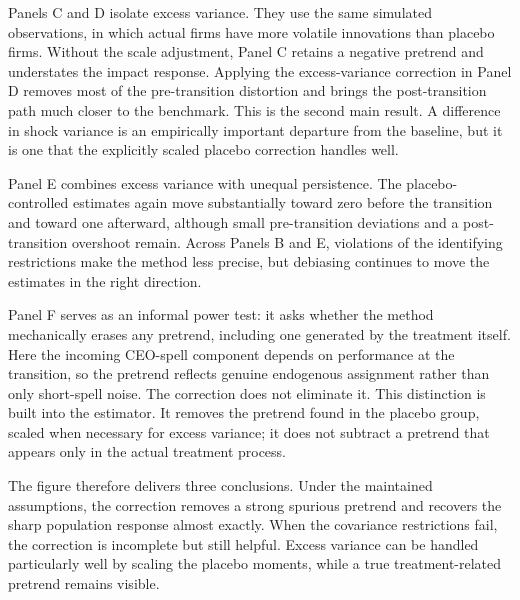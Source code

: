 \documentclass[sigconf,nonacm]{acmart}
\begin{document}
Panels C and D isolate excess variance. They use the same simulated observations, in which actual firms have more volatile innovations than placebo firms. Without the scale adjustment, Panel C retains a negative pretrend and understates the impact response. Applying the excess-variance correction in Panel D removes most of the pre-transition distortion and brings the post-transition path much closer to the benchmark. This is the second main result. A difference in shock variance is an empirically important departure from the baseline, but it is one that the explicitly scaled placebo correction handles well.

Panel E combines excess variance with unequal persistence. The placebo-controlled estimates again move substantially toward zero before the transition and toward one afterward, although small pre-transition deviations and a post-transition overshoot remain. Across Panels B and E, violations of the identifying restrictions make the method less precise, but debiasing continues to move the estimates in the right direction.

\balance

Panel F serves as an informal power test: it asks whether the method mechanically erases any pretrend, including one generated by the treatment itself. Here the incoming CEO-spell component depends on performance at the transition, so the pretrend reflects genuine endogenous assignment rather than only short-spell noise. The correction does not eliminate it. This distinction is built into the estimator. It removes the pretrend found in the placebo group, scaled when necessary for excess variance; it does not subtract a pretrend that appears only in the actual treatment process.

The figure therefore delivers three conclusions. Under the maintained assumptions, the correction removes a strong spurious pretrend and recovers the sharp population response almost exactly. When the covariance restrictions fail, the correction is incomplete but still helpful. Excess variance can be handled particularly well by scaling the placebo moments, while a true treatment-related pretrend remains visible.
\end{document}
